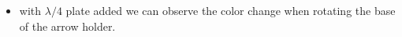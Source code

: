 \begin{minipage}{0.55\textwidth}
    
\end{minipage}
\hfill
\begin{minipage}{0.35\textwidth}
    \begin{itemize}
    	\item with $\lambda/4$ plate added we can observe the color change when rotating the base of the arrow holder.
    \end{itemize}
\end{minipage}